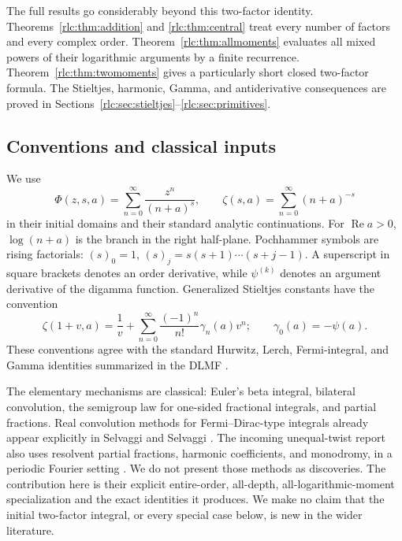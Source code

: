 \documentclass[11pt,a4paper]{article}
\numberwithin{equation}{section}
\theoremstyle{definition}\newtheorem{definition}[theorem]{Definition}
\theoremstyle{remark}\newtheorem{remark}[theorem]{Remark}
\DeclareMathOperator{\Rea}{Re}
\begin{document}
The full results go considerably beyond this two-factor identity.
Theorems~\ref{rlc:thm:addition} and \ref{rlc:thm:central} treat every
number of factors and every complex order. Theorem~\ref{rlc:thm:allmoments}
evaluates all mixed powers of their logarithmic arguments by a finite
recurrence. Theorem~\ref{rlc:thm:twomoments} gives a particularly short
closed two-factor formula. The Stieltjes, harmonic, Gamma, and
antiderivative consequences are proved in
Sections~\ref{rlc:sec:stieltjes}--\ref{rlc:sec:primitives}.

\subsection{Conventions and classical inputs}
We use
\[
 \Phi(z,s,a)=\sum_{n=0}^\infty\frac{z^n}{(n+a)^s},\qquad
 \zeta(s,a)=\sum_{n=0}^\infty(n+a)^{-s}
\]
in their initial domains and their standard analytic continuations.
For $\Rea a>0$, $\log(n+a)$ is the branch in the right half-plane.
Pochhammer symbols are rising factorials:
$(s)_0=1$, $(s)_j=s(s+1)\cdots(s+j-1)$.
A superscript in square brackets denotes an order derivative, while
$\psi^{(k)}$ denotes an argument derivative of the digamma function.
Generalized Stieltjes constants have the convention
\begin{equation}\label{rlc:eq:stieltjesconvention}
 \zeta(1+v,a)=\frac1v+
 \sum_{n=0}^\infty\frac{(-1)^n}{n!}\gamma_n(a)v^n;
 \qquad \gamma_0(a)=-\psi(a).
\end{equation}
These conventions agree with the standard Hurwitz, Lerch, Fermi-integral,
and Gamma identities summarized in the DLMF \cite{DLMF}.

The elementary mechanisms are classical: Euler's beta integral,
bilateral convolution, the semigroup law for one-sided fractional
integrals, and partial fractions. Real convolution methods for
Fermi--Dirac-type integrals already appear explicitly in
Selvaggi and Selvaggi \cite{Selvaggi}. The incoming unequal-twist report
also uses resolvent partial fractions, harmonic coefficients, and
monodromy, in a periodic Fourier setting \cite{UTJ}.
We do not present those methods as discoveries. The contribution here
is their explicit entire-order, all-depth, all-logarithmic-moment
specialization and the exact identities it produces. We make no claim
that the initial two-factor integral, or every special case below, is
new in the wider literature.
\end{document}
